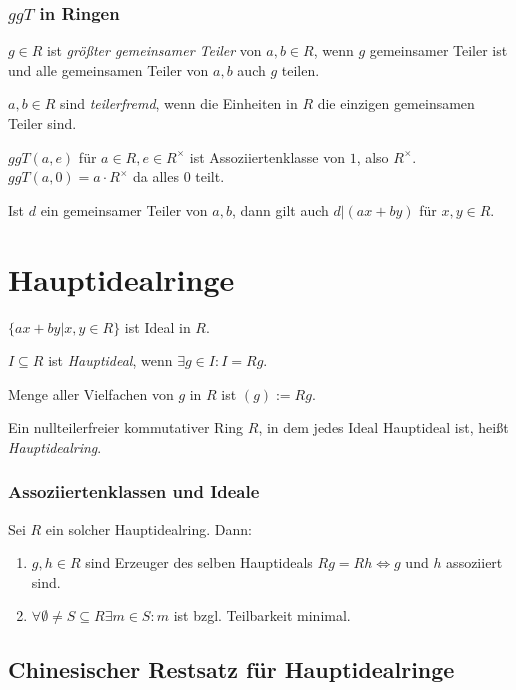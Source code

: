 \subsubsection*{$ggT$ in Ringen}

$g \in R$ ist \emph{größter gemeinsamer Teiler} von $a, b \in R$, wenn $g$ gemeinsamer Teiler ist und alle gemeinsamen Teiler von $a, b$ auch $g$ teilen.

$a, b \in R$ sind \emph{teilerfremd}, wenn die Einheiten in $R$ die einzigen gemeinsamen Teiler sind.

\spacing

$ggT(a,e)$ für $a \in R, e \in R^\times$ ist Assoziiertenklasse von $1$, also $R^\times$. $ggT(a,0) = a\cdot R^\times$ da alles $0$ teilt.

Ist $d$ ein gemeinsamer Teiler von $a, b$, dann gilt auch $d |(ax+by)$ für $x,y \in R$.

\section*{Hauptidealringe}

$\{ax+by | x,y \in R\}$ ist Ideal in $R$.

$I \subseteq R$ ist \emph{Hauptideal}, wenn $\exists g \in I : I = Rg$.

Menge aller Vielfachen von $g$ in $R$ ist $(g) := Rg$.

\spacing

Ein nullteilerfreier kommutativer Ring $R$, in dem jedes Ideal Hauptideal ist, heißt \emph{Hauptidealring}.

\subsubsection*{Assoziiertenklassen und Ideale}

Sei $R$ ein solcher Hauptidealring. Dann:

\begin{enumerate}[label=(\alph*)]
	\item $g, h \in R$ sind Erzeuger des selben Hauptideals $Rg = Rh \iff g$ und $h$ assoziiert sind.
	\item $\forall \emptyset \neq S \subseteq R \exists m \in S : m$ ist bzgl. Teilbarkeit minimal.
\end{enumerate}

\subsection*{Chinesischer Restsatz für Hauptidealringe}

